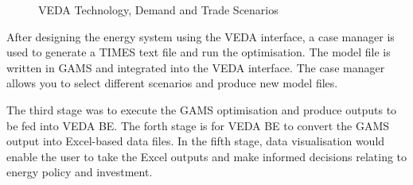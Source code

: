 \documentclass[12pt]{article}
\begin{document}
\begin{figure}[H]
	\caption{VEDA Technology, Demand and Trade Scenarios}%
	\label{fig:TDT}
\end{figure}


After designing the energy system using the VEDA interface, a case manager is used to generate a TIMES text file and 
run the optimisation. The model file is written in GAMS and integrated into the VEDA interface. 
The case manager allows you to select different scenarios and produce new model files.

The third stage was to execute the GAMS optimisation and produce outputs to be fed into VEDA BE. 
The forth stage is for VEDA BE to convert the GAMS output into Excel-based data files. 
In the fifth stage, data visualisation would enable the user to take the Excel outputs and make informed decisions relating to energy policy and investment.
\end{document}

